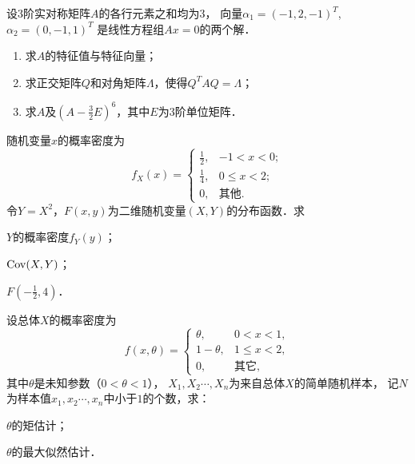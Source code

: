 \documentclass[plain,noanswer,medmath]{../../template/jnuexam}
\begin{document}
\begin{problem}[points=13]%
设$3$阶实对称矩阵$A$的各行元素之和均为$3$，
向量$\alpha_1 = \left(- 1,2, - 1 \right)^T$,$\alpha_2 = \left(0, - 1,1 \right)^T$
是线性方程组$Ax = 0$的两个解．
\begin{enumerate}
\item 求$A$的特征值与特征向量；
\item 求正交矩阵$Q$和对角矩阵$\Lambda$，使得$Q^T AQ = \Lambda$；
\item 求$A$及$\left(A - \frac{3}{2}E \right)^6$，其中$E$为$3$阶单位矩阵．
\end{enumerate}
\end{problem}


\begin{problem}[points=13]%
随机变量$x$的概率密度为
$$f_X(x) = \begin{cases}
  \frac{1}{2}, & -1 < x < 0; \\
  \frac{1}{4}, & 0 \le x < 2; \\
            0, & \text{其他}.
\end{cases}$$
令$Y = X^2$，$F(x,y)$为二维随机变量$(X,Y)$的分布函数．求\par
\begin{enumerate*}
\item $Y$的概率密度$f_Y(y)$；
\item $\operatorname{Cov}(X,Y)$；
\item $F\left(-\frac{1}{2},4\right)$．
\end{enumerate*}
\end{problem}


\begin{problem}[points=13]%
设总体$X$的概率密度为
$$f(x,\theta) = \begin{cases}
      \theta , & 0 < x < 1, \\
  1 - \theta , & 1 \le x < 2, \\
            0, & \text{其它},
\end{cases}$$
其中$\theta$是未知参数（$0 < \theta < 1$），
$X_1,X_2\cdots ,X_{n}$为来自总体$X$的简单随机样本，
记$N$为样本值$x_1,x_2\cdots ,x_n$中小于$1$的个数，求：\par
\begin{enumerate*}
\item $\theta$的矩估计；
\item $\theta$的最大似然估计．
\end{enumerate*}
\end{problem}
\end{document}
